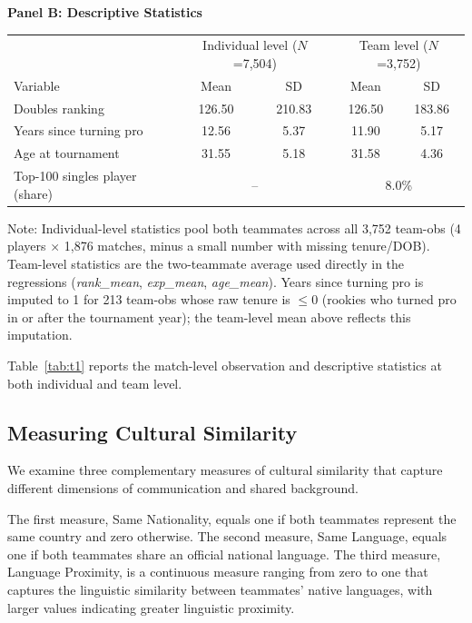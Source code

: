 \documentclass[10pt]{article}
\begin{document}
\begin{table}[htbp]
\begin{threeparttable}
\vspace{10pt}
\textbf{Panel B: Descriptive Statistics}\\[2pt]
\begin{tabular}{lcccc}
\toprule
 & \multicolumn{2}{c}{Individual level ($N$=7,504)} & \multicolumn{2}{c}{Team level ($N$=3,752)} \\
Variable & Mean & SD & Mean & SD \\
\midrule
Doubles ranking            & 126.50 & 210.83 & 126.50 & 183.86 \\
Years since turning pro    & 12.56  & 5.37   & 11.90  & 5.17   \\
Age at tournament          & 31.55  & 5.18   & 31.58  & 4.36   \\
Top-100 singles player (share) & \multicolumn{2}{c}{--} & \multicolumn{2}{c}{8.0\%} \\
\bottomrule
\end{tabular}
\begin{tablenotes}
\small
\item Note: Individual-level statistics pool both teammates across all 3,752 team-obs (4 players $\times$ 1,876 matches, minus a small number with missing tenure/DOB). Team-level statistics are the two-teammate average used directly in the regressions (\textit{rank\_mean}, \textit{exp\_mean}, \textit{age\_mean}). Years since turning pro is imputed to 1 for 213 team-obs whose raw tenure is $\le 0$ (rookies who turned pro in or after the tournament year); the team-level mean above reflects this imputation.
\end{tablenotes}
\end{threeparttable}
\end{table}
\FloatBarrier

Table~\ref{tab:t1} reports the match-level observation and descriptive statistics at both individual and team level.

\subsection{Measuring Cultural Similarity}
We examine three complementary measures of cultural similarity that capture different dimensions of communication and shared background.

The first measure, Same Nationality, equals one if both teammates represent the same country and zero otherwise. The second measure, Same Language, equals one if both teammates share an official national language. The third measure, Language Proximity, is a continuous measure ranging from zero to one that captures the linguistic similarity between teammates' native languages, with larger values indicating greater linguistic proximity.
\end{document}
